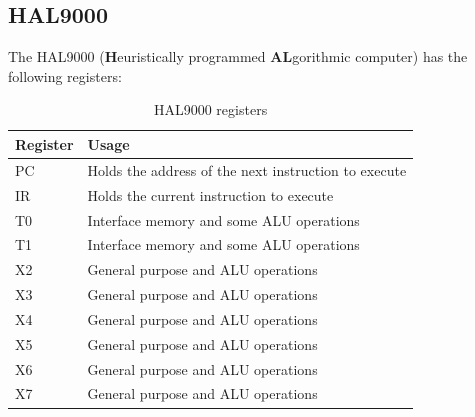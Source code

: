 \documentclass[11pt, a4paper]{article}
\begin{document}
\subsection{HAL9000}
The HAL9000 (\textbf{H}euristically programmed \textbf{AL}gorithmic computer) has the following
registers:
\begin{table}[ht]
	\centering
	{
		\selectfont
		\begin{tabular}{ | l | l | }
			\hline
			\textbf{Register} & \textbf{Usage} \\
			\hline
			PC & Holds the address of the next instruction to execute \\
			\hline
			IR & Holds the current instruction to execute \\
			\hline
			T0 & Interface memory and some ALU operations \\
			\hline
			T1 & Interface memory and some ALU operations \\
			\hline
			X2 & General purpose and ALU operations \\
			\hline
			X3 & General purpose and ALU operations \\
			\hline
			X4 & General purpose and ALU operations \\
			\hline
			X5 & General purpose and ALU operations \\
			\hline
			X6 & General purpose and ALU operations \\
			\hline
			X7 & General purpose and ALU operations \\
			\hline
		\end{tabular}
	}
	\caption{HAL9000 registers}
	\label{table:h9kregisters}
\end{table}
\end{document}
